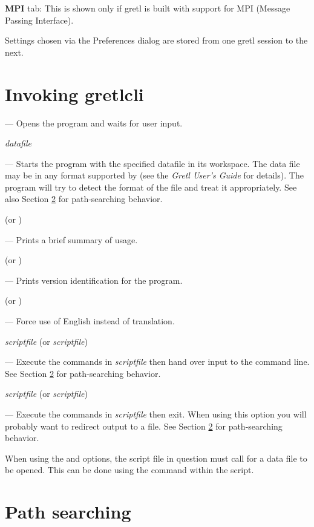 \textbf{MPI} tab: This is shown only if gretl is built with support
for MPI (Message Passing Interface).
      
Settings chosen via the Preferences dialog are stored from one gretl
session to the next.
      
\section{Invoking gretlcli}
\label{optarg2}


--- Opens the program and waits for user input.
      
 \textsl{datafile}

--- Starts the program with the specified datafile in its
workspace. The data file may be in any format supported by 
(see the \emph{Gretl User's Guide} for details). The program will try
to detect the format of the file and treat it appropriately. See also
Section \ref{path-search} for path-searching behavior.

 (or )

--- Prints a brief summary of usage.

 (or )

--- Prints version identification for the program.

 (or )

--- Force use of English instead of translation.

 \textsl{scriptfile} (or 
\textsl{scriptfile})

--- Execute the commands in \textsl{scriptfile} then hand over input
to the command line.  See Section \ref{path-search} for path-searching
behavior.

 \textsl{scriptfile} (or 
\textsl{scriptfile})

--- Execute the commands in \textsl{scriptfile} then exit.  When using
this option you will probably want to redirect output to a file. See
Section \ref{path-search} for path-searching behavior.

When using the  and  options, the script file
in question must call for a data file to be opened. This can be done
using the  command within the script.
      
\section{Path searching}
\label{path-search}

